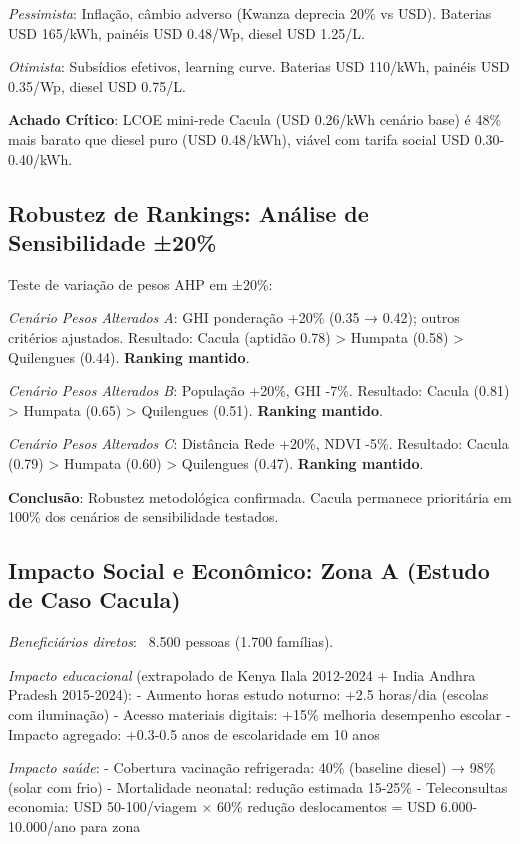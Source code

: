 \documentclass[12pt, a4paper]{article}
\begin{document}
\textit{Pessimista}: Inflação, câmbio adverso (Kwanza deprecia 20\% vs USD). Baterias USD 165/kWh, painéis USD 0.48/Wp, diesel USD 1.25/L.

\textit{Otimista}: Subsídios efetivos, learning curve. Baterias USD 110/kWh, painéis USD 0.35/Wp, diesel USD 0.75/L.

\textbf{Achado Crítico}: LCOE mini-rede Cacula (USD 0.26/kWh cenário base) é 48\% mais barato que diesel puro (USD 0.48/kWh), viável com tarifa social USD 0.30-0.40/kWh.

\subsection{Robustez de Rankings: Análise de Sensibilidade ±20\%}

Teste de variação de pesos AHP em ±20\%:

\textit{Cenário Pesos Alterados A}: GHI ponderação +20\% (0.35 → 0.42); outros critérios ajustados.
Resultado: Cacula (aptidão 0.78) > Humpata (0.58) > Quilengues (0.44). \textbf{Ranking mantido}.

\textit{Cenário Pesos Alterados B}: População +20\%, GHI -7\%.
Resultado: Cacula (0.81) > Humpata (0.65) > Quilengues (0.51). \textbf{Ranking mantido}.

\textit{Cenário Pesos Alterados C}: Distância Rede +20\%, NDVI -5\%.
Resultado: Cacula (0.79) > Humpata (0.60) > Quilengues (0.47). \textbf{Ranking mantido}.

\textbf{Conclusão}: Robustez metodológica confirmada. Cacula permanece prioritária em 100\% dos cenários de sensibilidade testados.

\subsection{Impacto Social e Econômico: Zona A (Estudo de Caso Cacula)}

\textit{Beneficiários diretos}: ~8.500 pessoas (1.700 famílias).

\textit{Impacto educacional} (extrapolado de Kenya Ilala 2012-2024 + India Andhra Pradesh 2015-2024):
- Aumento horas estudo noturno: +2.5 horas/dia (escolas com iluminação)
- Acesso materiais digitais: +15\% melhoria desempenho escolar
- Impacto agregado: +0.3-0.5 anos de escolaridade em 10 anos

\textit{Impacto saúde}:
- Cobertura vacinação refrigerada: 40\% (baseline diesel) → 98\% (solar com frio)
- Mortalidade neonatal: redução estimada 15-25\%
- Teleconsultas economia: USD 50-100/viagem × 60\% redução deslocamentos = USD 6.000-10.000/ano para zona
\end{document}
